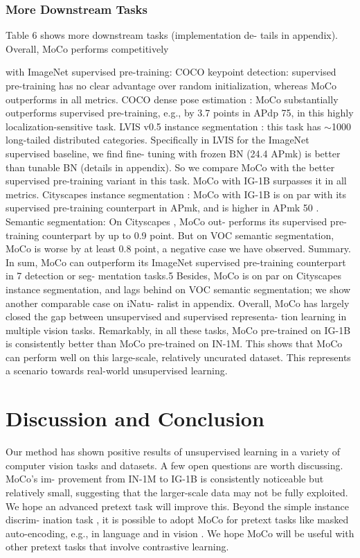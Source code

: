 \documentclass[10pt,twocolumn]{article}  %
\begin{document}
\subsubsection{More Downstream Tasks}
Table 6 shows more downstream tasks (implementation de-
tails in appendix). Overall, MoCo performs competitively

with ImageNet supervised pre-training:
COCO keypoint detection: supervised pre-training has
no clear advantage over random initialization, whereas
MoCo outperforms in all metrics.
COCO dense pose estimation \cite{1_guler2018densepose}: MoCo substantially
outperforms supervised pre-training, e.g., by 3.7 points in
APdp
75, in this highly localization-sensitive task.
LVIS v0.5 instance segmentation \cite{27_gupta2019lvis}: this task has
$\sim $1000 long-tailed distributed categories. Speciﬁcally in
LVIS for the ImageNet supervised baseline, we ﬁnd ﬁne-
tuning with frozen BN (24.4 APmk) is better than tunable
BN (details in appendix). So we compare MoCo with the
better supervised pre-training variant in this task. MoCo
with IG-1B surpasses it in all metrics.
Cityscapes instance segmentation \cite{10_cordts2016cityscapes}: MoCo with IG-1B
is on par with its supervised pre-training counterpart in
APmk, and is higher in APmk
50 .
Semantic segmentation: On Cityscapes \cite{10_cordts2016cityscapes}, MoCo out-
performs its supervised pre-training counterpart by up to 0.9
point. But on VOC semantic segmentation, MoCo is worse
by at least 0.8 point, a negative case we have observed.
Summary. In sum, MoCo can outperform its ImageNet
supervised pre-training counterpart in 7 detection or seg-
mentation tasks.5 Besides, MoCo is on par on Cityscapes
instance segmentation, and lags behind on VOC semantic
segmentation; we show another comparable case on iNatu-
ralist \cite{57_vanhorn2018inaturalist} in appendix. Overall, MoCo has largely closed
the gap between unsupervised and supervised representa-
tion learning in multiple vision tasks.
Remarkably, in all these tasks, MoCo pre-trained on
IG-1B is consistently better than MoCo pre-trained on
IN-1M. This shows that MoCo can perform well on this
large-scale, relatively uncurated dataset. This represents a
scenario towards real-world unsupervised learning.

\section{Discussion and Conclusion}
\hspace{1em} Our method has shown positive results of unsupervised
learning in a variety of computer vision tasks and datasets.
A few open questions are worth discussing. MoCo's im-
provement from IN-1M to IG-1B is consistently noticeable
but relatively small, suggesting that the larger-scale data
may not be fully exploited. We hope an advanced pretext
task will improve this. Beyond the simple instance discrim-
ination task \cite{61_wu2018unsupervised}, it is possible to adopt MoCo for pretext
tasks like masked auto-encoding, e.g., in language \cite{12_devlin2019bert} and
in vision \cite{46_oord2018representation}. We hope MoCo will be useful with other
pretext tasks that involve contrastive learning.



\end{document}
